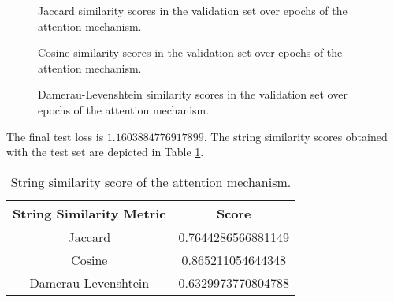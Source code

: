 \documentclass[12pt]{article}
\begin{document}
\begin{enumerate}[leftmargin=\labelsep]
          \begin{figure}[H]
              \centering
              
              \caption{Jaccard similarity scores in the validation set over epochs of the attention mechanism.}
              \label{fig:attention-attention-jaccard}
          \end{figure}

          \begin{figure}[H]
              \centering
              
              \caption{Cosine similarity scores in the validation set over epochs of the attention mechanism.}
              \label{fig:attention-attention-cosine}
          \end{figure}

          \begin{figure}[H]
              \centering
              
              \caption{Damerau-Levenshtein similarity scores in the validation set over epochs of the attention mechanism.}
              \label{fig:attention-attention-damerau-levenshtein}
          \end{figure}

          \vspace{12pt}

          The final test loss is $1.1603884776917899$. The string similarity scores obtained with the test set are depicted in Table \ref{tab:attention-attention-test-scores}.

          \begin{table}[H]
              \centering
              \begin{tabular}{|c|c|}
                  \hline
                  \textbf{String Similarity Metric} & \textbf{Score}     \\ \hline
                  Jaccard                           & 0.7644286566881149  \\ \hline
                  Cosine                            & 0.865211054644348 \\ \hline
                  Damerau-Levenshtein               & 0.6329973770804788 \\ \hline
              \end{tabular}
              \caption{String similarity score of the attention mechanism.}
              \label{tab:attention-attention-test-scores}
          \end{table}


\end{enumerate}
\end{document}
